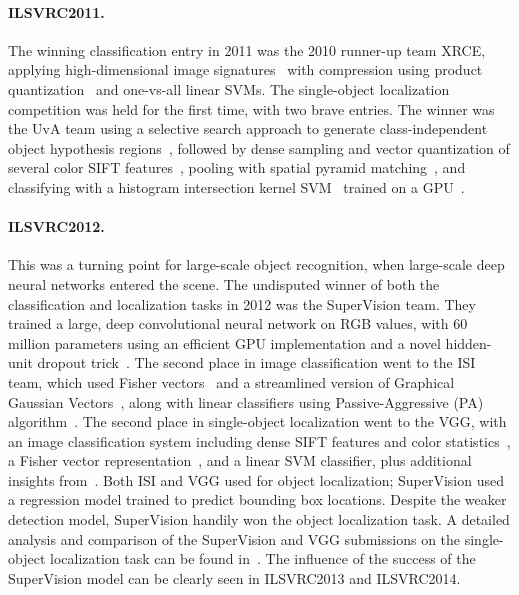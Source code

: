\paragraph{ILSVRC2011.} The winning classification entry in 2011 was the 2010 runner-up team XRCE, applying high-dimensional image signatures~\citep{Perronnin10} with compression using product quantization~\citep{Sanchez11} and one-vs-all linear SVMs. The single-object localization competition was held for the first time, with two brave entries. The winner was the UvA team using a selective search approach to generate class-independent object hypothesis regions~\citep{vanDeSande11}, followed by dense sampling and vector quantization of several color SIFT features~\citep{vanDeSande10}, pooling with spatial pyramid matching~\citep{Lazebnik06}, and classifying with a histogram intersection kernel SVM~\citep{Maji09} trained on a GPU~\citep{vanDeSande11b}.


\paragraph{ILSVRC2012.} This was a turning point for large-scale object recognition, when large-scale deep neural networks entered the scene. The undisputed winner of both the classification and localization tasks in 2012 was the SuperVision team. They trained a large, deep convolutional neural network on RGB values, with 60 million parameters using an efficient GPU implementation and a novel hidden-unit dropout trick~\citep{Krizhevsky12,Hinton12}. The second place in image classification went to the ISI team, which used Fisher vectors~\citep{Sanchez11} and a streamlined version of Graphical Gaussian Vectors~\citep{Harada12}, along with linear classifiers using Passive-Aggressive (PA) algorithm~\citep{Crammer06}.  The second place in single-object localization went to the VGG, with an image classification system including dense SIFT features and color statistics~\citep{Lowe04}, a Fisher vector representation~\citep{Sanchez11}, and a linear SVM classifier, plus additional insights from~\citep{Arandjelovic12,Sanchez12}. Both ISI and VGG used \citep{Felzenszwalb10} for object localization; SuperVision used a regression model trained to predict bounding box locations. Despite the weaker detection model, SuperVision handily won the object localization task. 
A detailed analysis and comparison of the SuperVision and VGG submissions on the single-object localization task can be found in~\citep{Russakovsky13}.
The influence of the success of the SuperVision model can be clearly seen in ILSVRC2013 and ILSVRC2014. 



